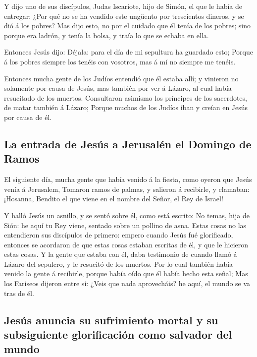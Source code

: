  Y dijo uno de sus discípulos, Judas Iscariote, hijo de
Simón, el que le había de entregar:  ¿Por qué no se ha
vendido este ungüento por trescientos dineros, y se dió á los pobres?
 Mas dijo esto, no por el cuidado que él tenía de los
pobres; sino porque era ladrón, y tenía la bolsa, y traía lo que se
echaba en ella.

 Entonces Jesús dijo: Déjala: para el día de mi sepultura
ha guardado esto;  Porque á los pobres siempre los tenéis
con vosotros, mas á mí no siempre me tenéis.

 Entonces mucha gente de los Judíos entendió que él estaba
allí; y vinieron no solamente por causa de Jesús, mas también por ver á
Lázaro, al cual había resucitado de los muertos. 
Consultaron asimismo los príncipes de los sacerdotes, de matar también á
Lázaro;  Porque muchos de los Judíos iban y creían en
Jesús por causa de él.

\hypertarget{la-entrada-de-jesuxfas-a-jerusaluxe9n-el-domingo-de-ramos}{%
\subsection{La entrada de Jesús a Jerusalén el Domingo de
Ramos}\label{la-entrada-de-jesuxfas-a-jerusaluxe9n-el-domingo-de-ramos}}

 El siguiente día, mucha gente que había venido á la
fiesta, como oyeron que Jesús venía á Jerusalem,  Tomaron
ramos de palmas, y salieron á recibirle, y clamaban: ¡Hosanna, Bendito
el que viene en el nombre del Señor, el Rey de Israel!

 Y halló Jesús un asnillo, y se sentó sobre él, como está
escrito:  No temas, hija de Sión: he aquí tu Rey viene,
sentado sobre un pollino de asna.  Estas cosas no las
entendieron sus discípulos de primero: empero cuando Jesús fué
glorificado, entonces se acordaron de que estas cosas estaban escritas
de él, y que le hicieron estas cosas.  Y la gente que
estaba con él, daba testimonio de cuando llamó á Lázaro del sepulcro, y
le resucitó de los muertos.  Por lo cual también había
venido la gente á recibirle, porque había oído que él había hecho esta
señal;  Mas los Fariseos dijeron entre sí: ¿Veis que nada
aprovecháis? he aquí, el mundo se va tras de él.

\hypertarget{jesuxfas-anuncia-su-sufrimiento-mortal-y-su-subsiguiente-glorificaciuxf3n-como-salvador-del-mundo}{%
\subsection{Jesús anuncia su sufrimiento mortal y su subsiguiente
glorificación como salvador del
mundo}\label{jesuxfas-anuncia-su-sufrimiento-mortal-y-su-subsiguiente-glorificaciuxf3n-como-salvador-del-mundo}}

